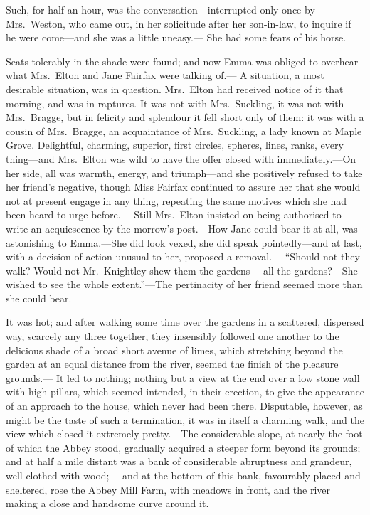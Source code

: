 Such, for half an hour, was the conversation---interrupted only
once by Mrs.\ Weston, who came out, in her solicitude after her
son-in-law, to inquire if he were come---and she was a little uneasy.---%
She had some fears of his horse.

Seats tolerably in the shade were found; and now Emma was obliged
to overhear what Mrs.\ Elton and Jane Fairfax were talking of.---%
A situation, a most desirable situation, was in question.  Mrs.\ Elton
had received notice of it that morning, and was in raptures.
It was not with Mrs.\ Suckling, it was not with Mrs.\ Bragge,
but in felicity and splendour it fell short only of them:  it was
with a cousin of Mrs.\ Bragge, an acquaintance of Mrs.\ Suckling,
a lady known at Maple Grove.  Delightful, charming, superior,
first circles, spheres, lines, ranks, every thing---and Mrs.\ Elton
was wild to have the offer closed with immediately.---On her side,
all was warmth, energy, and triumph---and she positively refused
to take her friend's negative, though Miss Fairfax continued
to assure her that she would not at present engage in any thing,
repeating the same motives which she had been heard to urge before.---%
Still Mrs.\ Elton insisted on being authorised to write an acquiescence
by the morrow's post.---How Jane could bear it at all, was astonishing
to Emma.---She did look vexed, she did speak pointedly---and at last,
with a decision of action unusual to her, proposed a removal.---%
``Should not they walk?  Would not Mr.\ Knightley shew them the gardens---%
all the gardens?---She wished to see the whole extent.''---The pertinacity
of her friend seemed more than she could bear.

It was hot; and after walking some time over the gardens in a scattered,
dispersed way, scarcely any three together, they insensibly
followed one another to the delicious shade of a broad short
avenue of limes, which stretching beyond the garden at an equal
distance from the river, seemed the finish of the pleasure grounds.---%
It led to nothing; nothing but a view at the end over a low stone
wall with high pillars, which seemed intended, in their erection,
to give the appearance of an approach to the house, which never had
been there.  Disputable, however, as might be the taste of such
a termination, it was in itself a charming walk, and the view
which closed it extremely pretty.---The considerable slope, at nearly
the foot of which the Abbey stood, gradually acquired a steeper
form beyond its grounds; and at half a mile distant was a bank
of considerable abruptness and grandeur, well clothed with wood;---%
and at the bottom of this bank, favourably placed and sheltered,
rose the Abbey Mill Farm, with meadows in front, and the river
making a close and handsome curve around it.

